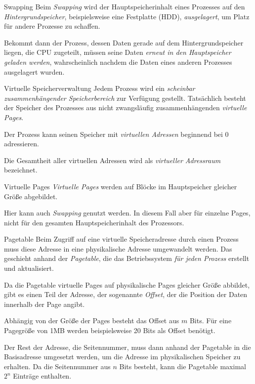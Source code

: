 \begin{defi}{Swapping}
    Beim \emph{Swapping} wird der
    Hauptspeicherinhalt eines Prozesses auf den \emph{Hintergrundspeicher}, beispielsweise
    eine Festplatte (HDD), \emph{ausgelagert}, um Platz für andere Prozesse zu schaffen.

    Bekommt dann der Prozess, dessen Daten gerade auf dem Hintergrundspeicher liegen,
    die CPU zugeteilt, müssen seine Daten \emph{erneut in den Hauptspeicher geladen werden},
    wahrscheinlich nachdem die Daten eines anderen Prozesses ausgelagert wurden.
\end{defi}

\begin{defi}{Virtuelle Speicherverwaltung}
    Jedem Prozess wird ein \emph{scheinbar zusammenhängender Speicherbereich} zur Verfügung gestellt.
    Tatsächlich besteht der Speicher des Prozesses aus nicht zwangsläufig zusammenhängenden \emph{virtuelle Pages}.

    Der Prozess kann seinen Speicher mit \emph{virtuellen Adressen} beginnend bei 0 adressieren.

    Die Gesamtheit aller virtuellen Adressen wird als \emph{virtueller Adressraum} bezeichnet.
\end{defi}

\begin{defi}{Virtuelle Pages}
    \emph{Virtuelle Pages} werden auf Blöcke im Hauptspeicher gleicher Größe abgebildet.

    Hier kann auch \emph{Swapping} genutzt werden. In diesem Fall aber für einzelne Pages, nicht für den gesamten Hauptspeicherinhalt des Prozessors.
\end{defi}

\begin{defi}{Pagetable}
    Beim Zugriff auf eine virtuelle Speicheradresse durch einen Prozess muss diese
    Adresse in eine physikalische Adresse umgewandelt werden. Das geschieht anhand
    der \emph{Pagetable}, die das Betriebssystem \emph{für jeden Prozess} erstellt und aktualisiert.

    Da
    die Pagetable virtuelle Pages auf physikalische Pages gleicher Größe abbildet, gibt es einen Teil der Adresse, der sogenannte \emph{Offset}, der die Position der Daten innerhalb
    der Page angibt.

    Abhängig von
    der Größe der Pages besteht das Offset aus $m$ Bits.
    Für eine Pagegröße von 1MB
    werden beispielsweise 20 Bits als Offset benötigt.

    Der Rest der Adresse, die Seitennummer,
    muss dann anhand der Pagetable in die Basisadresse umgesetzt werden,
    um die Adresse im physikalischen Speicher zu erhalten. Da die Seitennummer aus
    $n$ Bits besteht, kann die Pagetable maximal $2^n$ Einträge enthalten.
\end{defi}

